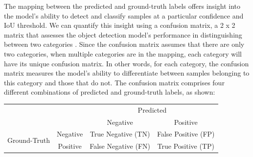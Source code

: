 The mapping between the predicted and ground-truth labels offers insight into the model's ability to detect and classify samples at a particular confidence and IoU threshold. We can quantify this insight using a confusion matrix, a 2 x 2 matrix that assesses the object detection model's performance in distinguishing between two categories \cite{confusion_matrix_2017}. Since the confusion matrix assumes that there are only two categories, when multiple categories are in the mapping, each category will have its unique confusion matrix. In other words, for each category, the confusion matrix measures the model's ability to differentiate between samples belonging to this category and those that do not. The confusion matrix comprises four different combinations of predicted and ground-truth labels, as shown:
\begin{table}[H]
    \centering
    \begin{tabular}{cc|cc|}
    \cline{3-4}
                                                        &          & \multicolumn{2}{c|}{Predicted}                                 \\ \cline{3-4} 
                                                        &          & \multicolumn{1}{c|}{Negative}            & Positive            \\ \hline
    \multicolumn{1}{|c|}{\multirow{2}{*}{Ground-Truth}} & Negative & \multicolumn{1}{c|}{True Negative (TN)}  & False Positive (FP) \\ \cline{2-4} 
    \multicolumn{1}{|c|}{}                              & Positive & \multicolumn{1}{c|}{False Negative (FN)} & True Positive (TP)  \\ \hline
    \end{tabular}
\end{table}

